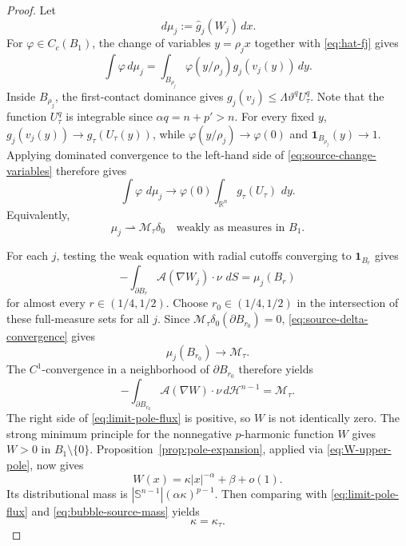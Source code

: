 \documentclass[reqno,12pt]{amsart}
\numberwithin{equation}{section}
\theoremstyle{remark}
\newcommand{\R}{\mathbb R}
\newcommand{\dd}{\,d}
\newcommand{\Acal}{\mathcal A}
\newcommand{\weakto}{\rightharpoonup}
\begin{document}
\begin{proof}
Let
$$
\dd\mu_j:=\widehat g_j(W_j)\dd x.
$$
For $\varphi\in C_c(B_1)$, the change of variables $y=\rho_jx$ together with \eqref{eq:hat-fj} gives
\begin{equation}\label{eq:source-change-variables}
 \int\varphi\dd\mu_j
 =\int_{B_{\rho_j}}
   \varphi(y/\rho_j)g_j(v_j(y))\dd y.
\end{equation}
Inside $B_{\rho_j}$, the first-contact dominance gives
$g_j(v_j)\le\Lambda\vartheta^qU_\tau^q$.  Note that the function $U_\tau^q$ is integrable since
$\alpha q=n+p'>n$.  For every fixed $y$,
$g_j(v_j(y))\to g_\tau(U_\tau(y))$, while
$\varphi(y/\rho_j)\to\varphi(0)$ and
$\mathbf 1_{B_{\rho_j}}(y)\to1$.  Applying dominated convergence to the left-hand side of \eqref{eq:source-change-variables} therefore gives
$$
 \int\varphi\,\dd\mu_j
 \to   \varphi(0)\int_{\R^n}g_\tau(U_\tau)\,\dd y.
$$
Equivalently,
\begin{equation}\label{eq:source-delta-convergence}
\mu_j\weakto\mathcal M_\tau\delta_0
\quad\text{weakly as measures in }B_1.
\end{equation}

For each $j$, testing the weak equation with radial cutoffs
converging to $\mathbf 1_{B_r}$ gives
$$
-\int_{\partial B_r} \Acal(\nabla W_j)\cdot\nu\,\dd S=\mu_j(B_r)
$$
for almost every $r\in(1/4,1/2)$.
Choose $r_0\in(1/4,1/2)$ in the intersection of these
full-measure sets for all $j$.  Since 
$\mathcal M_\tau\delta_0(\partial B_{r_0})=0$,
\eqref{eq:source-delta-convergence} gives
$$
\mu_j(B_{r_0})\to \mathcal M_\tau.
$$
The $C^1$-convergence in a neighborhood of $\partial B_{r_0}$ therefore yields
\begin{equation}\label{eq:limit-pole-flux}
 -\int_{\partial B_{r_0}}\Acal(\nabla W)\cdot\nu\dd \mathcal H^{n-1}  =\mathcal M_\tau.
\end{equation}
The right side of \eqref{eq:limit-pole-flux} is positive, so $W$ is not identically zero.  The strong minimum principle for the nonnegative $p$-harmonic function $W$ gives $W>0$ in $B_1\setminus\{0\}$.  Proposition~\ref{prop:pole-expansion}, applied via \eqref{eq:W-upper-pole}, now gives
\begin{equation}\label{eq:W-pole-expansion}
W(x)=\kappa|x|^{-\alpha}+\beta+o(1).
\end{equation}
Its distributional mass is
$|\mathbb S^{n-1}|(\alpha\kappa)^{p-1}$.  Then comparing with
\eqref{eq:limit-pole-flux} and \eqref{eq:bubble-source-mass} yields
\begin{equation}\label{eq:kappa-identification}
\kappa=\kappa_\tau.
\end{equation}


\end{proof}
\end{document}
